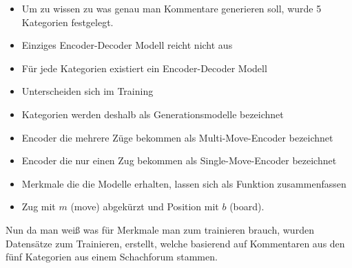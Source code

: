 \begin{itemize}[leftmargin=*]
\item Um zu wissen zu was genau man Kommentare generieren soll, wurde 5 Kategorien festgelegt.\\
\item Einziges Encoder-Decoder Modell reicht nicht aus
\item Für jede Kategorien existiert ein Encoder-Decoder Modell
\item Unterscheiden sich im Training
\item Kategorien werden deshalb als Generationsmodelle bezeichnet
\item Encoder die mehrere Züge bekommen als Multi-Move-Encoder bezeichnet
\item Encoder die nur einen Zug bekommen als Single-Move-Encoder bezeichnet
\item Merkmale die die Modelle erhalten, lassen sich als Funktion zusammenfassen
\item Zug mit $m$ (move) abgekürzt und Position mit $b$ (board).
\end{itemize}

Nun da man weiß was für Merkmale man zum trainieren brauch, wurden Datensätze zum Trainieren, erstellt, welche basierend auf Kommentaren aus den fünf Kategorien aus einem Schachforum stammen.